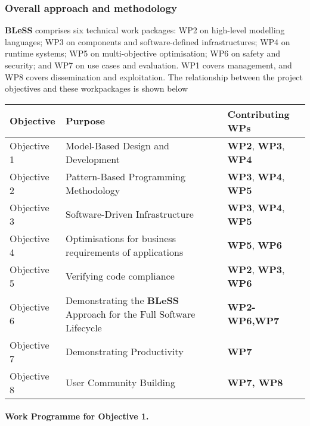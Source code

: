 \documentclass[a4paper,11pt]{article}
\newcommand{\project}[1]{\textbf{#1}\xspace}
\newcommand{\BLESS}{\project{BLeSS}}
\newcommand{\TheProject}{\BLESS}
\begin{document}
\subsubsection{Overall approach and methodology}


\TheProject{} comprises six technical work packages: WP2 on high-level modelling languages;
WP3 on components and software-defined infrastructures;
WP4 on runtime systems;
WP5 on multi-objective optimisation;
WP6 on safety and security; and
WP7 on use cases and evaluation.  WP1 covers management, and WP8 covers dissemination and exploitation.
The relationship between the project objectives and these workpackages is shown below

\vspace{-8pt}
\begin{center}
\begin{tabular}{|l|l|l|}\hline
\textbf{Objective} & \textbf{Purpose} & \textbf{Contributing WPs} \\\hline \hline
Objective 1 & Model-Based Design and Development & \textbf{WP2}, \textbf{WP3}, \textbf{WP4} \\\hline
Objective 2 & Pattern-Based Programming Methodology & \textbf{WP3}, \textbf{WP4}, \textbf{WP5} \\ \hline
Objective 3 & Software-Driven Infrastructure & \textbf{WP3}, \textbf{WP4}, \textbf{WP5}\\ \hline
Objective 4 & Optimisations for business requirements of applications & \textbf{WP5}, \textbf{WP6}\\ \hline
Objective 5 & Verifying code compliance & \textbf{WP2}, \textbf{WP3}, \textbf{WP6}\\ \hline
Objective 6 & Demonstrating the \TheProject{} Approach for the Full Software Lifecycle & \textbf{WP2-WP6,WP7} \\ \hline
Objective 7 & Demonstrating Productivity & \textbf{WP7} \\ \hline
Objective 8 & User Community Building & \textbf{WP7, WP8} \\\hline
\end{tabular}
\end{center}

\paragraph*{Work Programme for Objective 1.}
\end{document}
